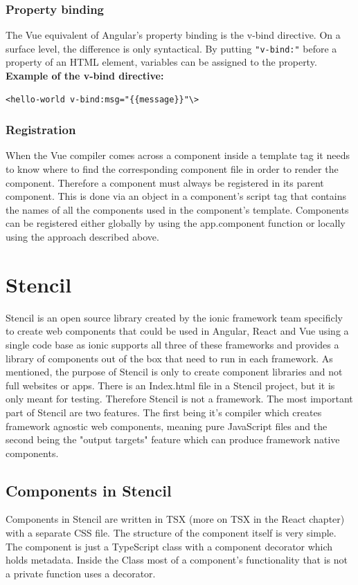\subsubsection{Property binding}
The Vue equivalent of Angular's property binding is the v-bind directive. On a surface level, the difference is only syntactical. By putting \verb+"v-bind:"+
before a property of an HTML element, variables can be assigned to the property.\\
\textbf{Example of the v-bind directive:}
\begin{Verbatim}[frame=single]
 <hello-world v-bind:msg="{{message}}"\>
\end{Verbatim}
\subsubsection{Registration}
When the Vue compiler comes across a component inside a template tag it needs to know where to find the corresponding component file in order to render the component. Therefore a component must always be registered in its parent component. This is done via an object in a component's script tag that contains the names of all the components used in the component's template.
Components can be registered either globally by using the app.component function or locally using the approach described above.

\section{Stencil}
Stencil is an open source library created by the ionic framework team specificly to create web components that could be used in Angular, React and Vue using a single code base as ionic supports all three of these frameworks and provides a library of components out of the box that need to run in each framework. As mentioned, the purpose of Stencil is only to create component libraries and not full websites or apps. There is an Index.html file in a Stencil project, but it is only meant for testing. Therefore Stencil is not a framework. The most important part of Stencil are two features. The first being it's compiler which creates framework agnostic web  components, meaning pure JavaScript files and the second being the "output targets" feature which can produce framework native components.

\subsection{Components in Stencil}
Components in Stencil are written in TSX (more on TSX in the React chapter) with a separate CSS file. The structure of the component itself is very simple. The component is just a TypeScript class with a component decorator which holds metadata. Inside the Class most of a component's functionality that is not a private function uses a decorator.

